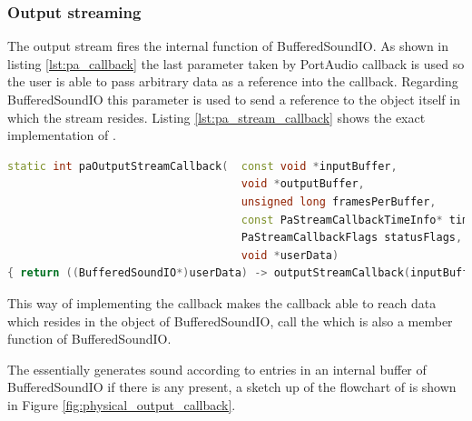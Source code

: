 		\subsubsection{Output streaming}
		The output stream fires the internal  function of BufferedSoundIO. As shown in listing \ref{lst:pa_callback}
		the last parameter taken by PortAudio callback  is used so the user is able to pass arbitrary data as a reference into the
		callback. Regarding BufferedSoundIO this parameter is used to send a reference to the object itself in which the stream resides. 
		Listing \ref{lst:pa_stream_callback} shows the exact implementation of .
		
		\begin{lstlisting}[float=htb,language={C++},caption={Implementation of \smalltt{paOutputStreamCallback.}},label={lst:pa_stream_callback}]
static int paOutputStreamCallback(	const void *inputBuffer,
									void *outputBuffer,
									unsigned long framesPerBuffer,
									const PaStreamCallbackTimeInfo* timeInfo,
									PaStreamCallbackFlags statusFlags,
									void *userData)
{ return ((BufferedSoundIO*)userData) -> outputStreamCallback(inputBuffer, outputBuffer, framesPerBuffer, timeInfo, statusFlags); }
		\end{lstlisting}
		
		This way of implementing the callback makes the callback able to reach data which resides in the object of BufferedSoundIO,
		 call the  which is also a member function of BufferedSoundIO.
		
		The  essentially generates sound according to entries in an internal buffer of BufferedSoundIO
		if there is any present, a sketch up of the flowchart of  is shown in Figure \ref{fig:physical_output_callback}.
		
